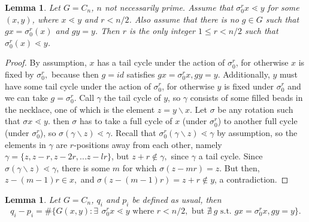 \documentclass[10 pt]{amsart}
\theoremstyle{plain}
\newtheorem{lem}[thm]{Lemma}
\theoremstyle{definition}
\theoremstyle{remark}
\numberwithin{equation}{section}
\newcommand{\minus}{\backslash}
\begin{document}
\begin{lem}{\label{lem:cyclic_bound_r}}
Let $G = C_n$, $n$ not necessarily prime. Assume that $\sigma_0^r x \lessdot y$ for some $(x,y)$, where $x \lessdot y$ and $r < n/2$. Also assume that there is no $g \in G$ such that $g x = \sigma_0^r (x)$ and $gy = y$. Then $r$ is the only integer $1 \le r < n/2$ such that $\sigma_0^r (x) \lessdot y$. 
\end{lem}
\begin{proof}

By assumption, $x$ has a tail cycle under the action of $\sigma_0^{r}$, for otherwise $x$ is fixed by $\sigma_0^r,$ because then $g = id$ satisfies $gx = \sigma_0^rx,gy = y.$ Additionally, $y$ must have some tail cycle under the action of $\sigma_0^r$, for otherwise $y$ is fixed under $\sigma_0^r$  and we can take $g = \sigma_0^r$.  Call $\gamma$ the tail cycle of $y$, so $\gamma$ consists of some filled beads in the necklace, one of which is the element $z = y \minus x$. Let $\sigma$ be any rotation such that $\sigma x \lessdot y$. then $\sigma$ has to take a full cycle of $x$ (under $\sigma_0^r$) to another full cycle (under $\sigma_0^r$), so $\sigma (\gamma \minus z) \lessdot \gamma$. Recall that $\sigma_0^r (\gamma \minus z) \lessdot \gamma$ by assumption, so the elements in $\gamma$ are $r$-positions away from each other, namely $\gamma = \{ z, z-r, z-2r, ... z -l r\}$, but $z+r \notin \gamma,$ since $\gamma$ a tail cycle. Since $\sigma (\gamma \minus z) \lessdot \gamma$, there is some $m$ for which $\sigma(z - m r) = z$. But then, $z-(m-1)r \in x,$ and $\sigma(z - (m-1)r) = z+r \notin y$, a contradiction. 
\end{proof}
\begin{lem}{\label{lem:cyclic_counting_difference}} 
Let $G= C_n$, $q_i$ and $p_i$ be defined as usual, 
then $$q_i - p_i = \#\{G{(x, y)} : \exists \: \, \sigma_0^r x \lessdot y \text{ where } r < n/2, \text{ but } \nexists \:  g \text{ s.t. } g x = \sigma_0 ^r x, g y = y \}.$$
\end{lem}
\end{document}
